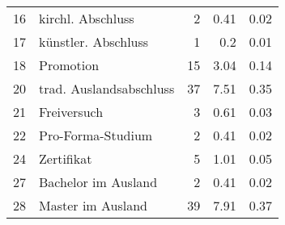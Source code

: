\begin{longtable}{lXrrr}
        16 & \multicolumn{1}{X}{kirchl. Abschluss} & %
          \num{2} &
          \num[round-mode=places,round-precision=2]{0,41} &
          \num[round-mode=places,round-precision=2]{0,02} \\

        17 & \multicolumn{1}{X}{künstler. Abschluss} & %
          \num{1} &
          \num[round-mode=places,round-precision=2]{0,2} &
          \num[round-mode=places,round-precision=2]{0,01} \\

        18 & \multicolumn{1}{X}{Promotion} & %
          \num{15} &
          \num[round-mode=places,round-precision=2]{3,04} &
          \num[round-mode=places,round-precision=2]{0,14} \\

        20 & \multicolumn{1}{X}{trad. Auslandsabschluss} & %
          \num{37} &
          \num[round-mode=places,round-precision=2]{7,51} &
          \num[round-mode=places,round-precision=2]{0,35} \\

        21 & \multicolumn{1}{X}{Freiversuch} & %
          \num{3} &
          \num[round-mode=places,round-precision=2]{0,61} &
          \num[round-mode=places,round-precision=2]{0,03} \\

        22 & \multicolumn{1}{X}{Pro-Forma-Studium} & %
          \num{2} &
          \num[round-mode=places,round-precision=2]{0,41} &
          \num[round-mode=places,round-precision=2]{0,02} \\

        24 & \multicolumn{1}{X}{Zertifikat} & %
          \num{5} &
          \num[round-mode=places,round-precision=2]{1,01} &
          \num[round-mode=places,round-precision=2]{0,05} \\

        27 & \multicolumn{1}{X}{Bachelor im Ausland} & %
          \num{2} &
          \num[round-mode=places,round-precision=2]{0,41} &
          \num[round-mode=places,round-precision=2]{0,02} \\

        28 & \multicolumn{1}{X}{Master im Ausland} & %
          \num{39} &
          \num[round-mode=places,round-precision=2]{7,91} &
          \num[round-mode=places,round-precision=2]{0,37} \\


\end{longtable}
